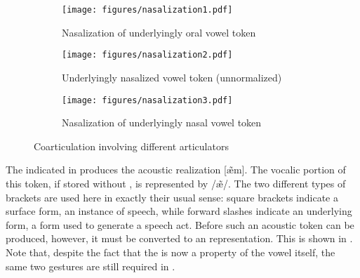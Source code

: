 \begin{figure}[H]
\begin{subfigure}[t]{.3\textwidth}
        \texttt{[image: figures/nasalization1.pdf]}
        \caption{\label{fig:Normal nasalization}Nasalization of underlyingly oral vowel token}
    \end{subfigure}\hfill
    \begin{subfigure}[t]{.3\textwidth}
        \texttt{[image: figures/nasalization2.pdf]}
        \caption{\label{fig:nasalized vowel}Underlyingly nasalized vowel token (unnormalized)}
    \end{subfigure}\hfill
    \begin{subfigure}[t]{.3\textwidth}
        \texttt{[image: figures/nasalization3.pdf]}
        \caption{\label{fig:extra nasalization}Nasalization of underlyingly nasal vowel token}
    \end{subfigure}
    

\caption{\label{fig:Coarticulation}Coarticulation involving different articulators}
\end{figure}

The  indicated in 
produces the acoustic realization {[æ̃m]}. The vocalic
portion of this token, if stored without , is represented
by {/æ̃/}. The two different types of brackets are used
here in exactly their usual sense: square brackets indicate a surface
form, an instance of speech, while forward slashes indicate an underlying
form, a form used to generate a speech act. Before such an acoustic
token can be produced, however, it must be converted to an 
representation. This is shown in .
Note that, despite the fact that the  is now a property
of the vowel itself, the same two  gestures are still
required in .

